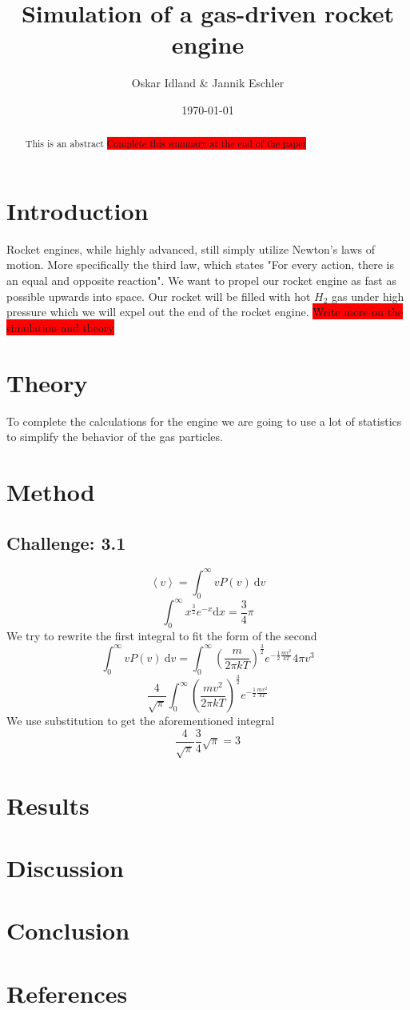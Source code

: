 \documentclass[reprint,english,notitlepage]{revtex4-2}
\begin{document}
\title{Simulation of a gas-driven rocket engine}
\author{Oskar Idland \& Jannik Eschler}
\date{\today}

\begin{abstract}
This is an abstract \colorbox{red}{Complete this summary at the end of the paper}
\end{abstract}
\maketitle

\section{Introduction}
	Rocket engines, while highly advanced, still simply utilize Newton's laws of motion. More specifically the third law, which states "For every action, there is an equal and opposite reaction". We want to propel our rocket engine as fast as possible upwards into space.
	Our rocket will be filled with hot $ H_2 $ gas under high pressure which we will expel out the end of the rocket engine. \colorbox{red}{Write more on the simulation and theory}
\section{Theory}
To complete the calculations for the engine we are going to use a lot of statistics to simplify the behavior of the gas particles. 
\section{Method}

	\subsection*{Challenge: 3.1}
		\[
		\left< v \right> = ∫ _{0}^{\infty} vP(v) \ \mathrm{d}v
		\]
		\[
		\int_{0}^{\infty} x^{\frac{3}{2}} e^{-x} \mathrm{d}x = \frac{3}{4} π 
		\]
		We try to rewrite the first integral to fit the form of the second 
		\[
		∫ _{0}^{\infty} vP(v) \ \mathrm{d}v = \int _{0}^{\infty} \left( \frac{m}{2 \pi k T} \right) ^{\frac{3}{2}} e ^{-\frac{1}{2} \frac{mv^{2}}{k T}} 4 π v^{3}
		\]
		\[
		\frac{4}{\sqrt{\pi}} ∫ _{0}^{\infty} \left( \frac{mv^{2}}{2 \pi k T} \right) ^{\frac{3}{2}} e ^{-\frac{1}{2} \frac{mv^{2}}{k T}} 
		\]
		We use substitution to get the aforementioned integral
		\[
		\frac{4}{\sqrt{\pi}} \frac{3}{4} \sqrt{\pi} = 3
		\]
	  

\section{Results}
\section{Discussion}
\section{Conclusion}
\section{References}
\end{document}
